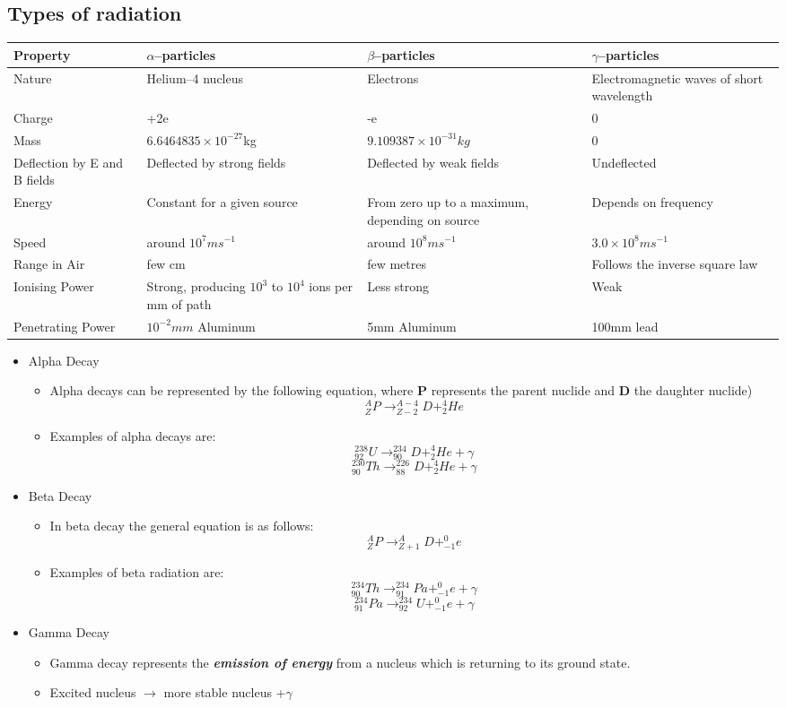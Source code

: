 {\subsection{Types of radiation}
\begin{tabular}{p{80pt} p{120pt} p{120pt} p{120pt} }\toprule
\hline
Property & $\alpha$--particles & $\beta$--particles & $\gamma$--particles \\ \midrule
Nature & Helium--4 nucleus & Electrons & Electromagnetic waves of short wavelength \\
Charge & +2e & -e & 0\\
Mass & $6.6464835 \times 10^{-27}$kg & $9.109387 \times 10^{-31}kg$ & 0 \\
Deflection by E and B fields & Deflected by strong fields & Deflected by weak fields & Undeflected\\
Energy & Constant for a given source & From zero up to a maximum, depending on source & Depends on frequency \\
Speed & around $10^7 ms^{-1}$ & around $10^8 ms^{-1}$ & $3.0 \times 10^8 ms^{-1}$\\
Range in Air & few cm & few metres & Follows the inverse square law\\
Ionising Power & Strong, producing $10^3$ to $10^4$ ions per mm of path & Less strong & Weak\\
Penetrating Power & $10^{-2}mm$ Aluminum & 5mm Aluminum & 100mm lead \\ \bottomrule
\end{tabular}

\begin{itemize}
\item Alpha Decay
\begin{itemize}
\item Alpha decays can be represented by the following equation, where \textbf{P} represents the parent nuclide and \textbf{D} the daughter nuclide)
$$_Z^A P \rightarrow _{Z-2}^{A-4} D + _2^4 He$$
\item Examples of alpha decays are:
$$_{92}^{238} U \rightarrow _{90}^{234} D + _2^4 He + \gamma$$
$$_{90}^{230} Th \rightarrow _{88}^{226} D + _2^4 He + \gamma$$
\end{itemize}
\item Beta Decay
\begin{itemize}
\item In beta decay the general equation is as follows:
$$_Z^A P \rightarrow _{Z+1}^A D + _{-1}^0 e $$
\item Examples of beta radiation are:
$$_{90}^{234} Th \rightarrow _{91}^{234} Pa + _{-1}^0 e + \gamma $$
$$_{91}^{234} Pa \rightarrow _{92}^{234} U + _{-1}^0 e + \gamma $$
\end{itemize}
\item Gamma Decay
\begin{itemize}
\item Gamma decay represents the \emph{\textbf{emission of energy}} from a nucleus which is returning to its ground state.
\item Excited nucleus $\rightarrow$ more stable nucleus +$\gamma$
\end{itemize}
\end{itemize}

}
